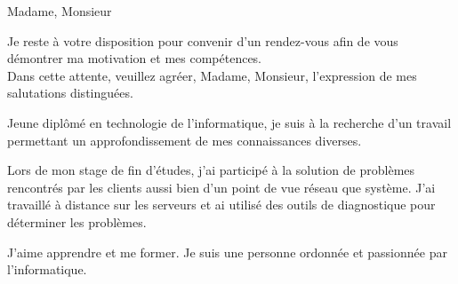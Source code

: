 \documentclass[11pt,a4paper]{moderncv}
\begin{document}
\date{\today} %
\opening{Madame, Monsieur} %
\closing{Je reste à votre disposition pour convenir d'un rendez-vous afin de vous démontrer ma motivation et mes compétences. \\ Dans cette attente, veuillez agréer, Madame, Monsieur, l'expression de mes salutations distinguées.} %

\makelettertitle %

Jeune diplômé en technologie de l'informatique, je suis à la recherche d'un travail permettant un approfondissement de mes connaissances diverses.

Lors de mon stage de fin d'études, j'ai participé à la solution de problèmes rencontrés par les clients aussi bien d'un point de vue réseau que système. J'ai travaillé à distance sur les serveurs et ai utilisé des outils de diagnostique pour déterminer les problèmes.   

J'aime apprendre et me former. Je suis une personne ordonnée et passionnée par l'informatique.       

\makeletterclosing %
\end{document}
